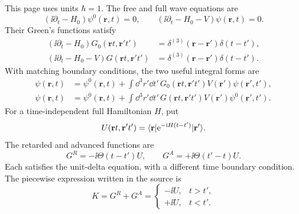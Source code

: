 This page uses units $\hbar=1$. The free and full wave equations are
\[
 (\ii\partial_t-H_0)\psi^0(\mathbf r,t)=0,\qquad
 (\ii\partial_t-H_0-V)\psi(\mathbf r,t)=0.
\]
Their Green's functions satisfy
\begin{align*}
 (\ii\partial_t-H_0)G_0(\mathbf r t,\mathbf r't')
   &=\delta^{(3)}(\mathbf r-\mathbf r')\delta(t-t'),\\
 (\ii\partial_t-H_0-V)G(\mathbf r t,\mathbf r't')
   &=\delta^{(3)}(\mathbf r-\mathbf r')\delta(t-t').
\end{align*}
With matching boundary conditions, the two useful integral forms are
\begin{align*}
 \psi(\mathbf r,t)&=\psi^0(\mathbf r,t)+
 \int\dd^3r'\dd t'\,G_0(\mathbf r t,\mathbf r't')
 V(\mathbf r')\psi(\mathbf r',t'),\\
 \psi(\mathbf r,t)&=\psi^0(\mathbf r,t)+
 \int\dd^3r'\dd t'\,G(\mathbf r t,\mathbf r't')
 V(\mathbf r')\psi^0(\mathbf r',t').
\end{align*}
For a time-independent full Hamiltonian $H$, put
\[
 U(\mathbf r t,\mathbf r't')=
 \langle \mathbf r\rvert \mathrm{e}^{-\mathrm{i} H(t-t')}\lvert \mathbf r'\rangle.
\]
The retarded and advanced functions are
\[
 G^R=-\ii\Theta(t-t')U,\qquad
 G^A=+\ii\Theta(t'-t)U.
\]
Each satisfies the unit-delta equation, with a different time boundary
condition. The piecewise expression written in the source is
\[
 K=G^R+G^A=
 \begin{cases}
 -\ii U,&t>t',\\
 +\ii U,&t<t'.
 \end{cases}
\]
